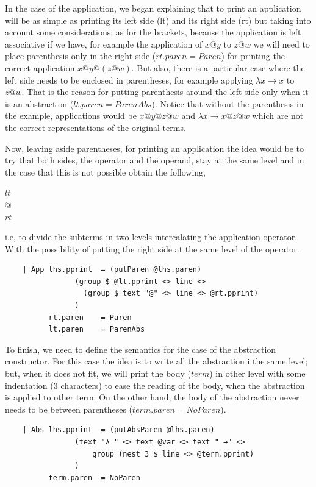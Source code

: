 \documentclass[a4paper,10pt]{article}
\begin{document}
In the case of the application, we began explaining that to print an application will
be as simple  as printing its left side (lt) and its right side (rt) but taking into account 
some considerations; as for the brackets, because the application is left associative if we
have, for example the application of $x@y$ to $z@w$ we will need to place parenthesis only in the right side ($rt.paren = Paren$) for printing the correct application $x@y@(z@w)$. But also, there is
a particular case where the left side needs to be enclosed in parentheses, for example
applying $\lambda x \rightarrow x$ to $z@w$. That is the reason for putting parenthesis
around the left side only when it is an abstraction ($lt.paren = ParenAbs$).
Notice that without the parenthesis in the example, applications would be $x@y@z@w$ and
$\lambda x \rightarrow x@z@w$ which are not the correct representations of the original
terms.

Now, leaving aside parentheses, for printing an application the idea would be to try that
both sides, the operator and the operand, stay at the same level and in the case that this is not
possible obtain the following,

\begin{center}
$lt$\\
$@$\\
$rt$
\end{center}

i.e, to divide the subterms in two levels intercalating the application operator. With the
possibility of putting the right side at the same level of the operator.

\begin{lstlisting}    
    | App lhs.pprint  = (putParen @lhs.paren) 
                (group $ @lt.pprint <> line <> 
                  (group $ text "@" <> line <> @rt.pprint)
                )
          rt.paren    = Paren
          lt.paren    = ParenAbs
\end{lstlisting}    

To finish, we need to define the semantics for the case of the abstraction constructor.
For this case the idea is to write all the abstraction i the same level; but, when it
does not fit, we will print the body ($term$) in other level with some
indentation (3 characters) to ease the reading of the body, when the abstraction is applied
to other term. On the other hand, the body of the abstraction never
needs to be between parentheses ($term.paren = NoParen$).

\begin{lstlisting}
    | Abs lhs.pprint  = (putAbsParen @lhs.paren)
                (text "λ " <> text @var <> text " →" <> 
                    group (nest 3 $ line <> @term.pprint)
                )
          term.paren  = NoParen
\end{lstlisting}
\end{document}
